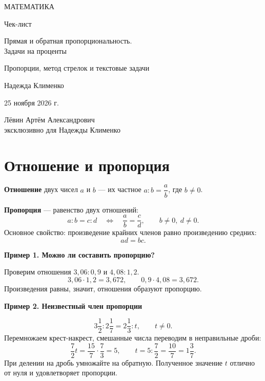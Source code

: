\documentclass[a4paper,12pt]{article}
\newcommand{\ex}[1]{\par\smallskip\textcolor{darkaccent}{\textbf{#1}}\par}
\begin{document}
\begin{titlepage}
\centering
\vspace*{28mm}
{\Large\color{darkaccent} МАТЕМАТИКА\par}
\vspace{16mm}
{\Huge Чек-лист\par}
\vspace{10mm}
{\LARGE\color{accent} Прямая и обратная пропорциональность.\\[2mm] Задачи на проценты\par}
\vspace{14mm}
{\large Пропорции, метод стрелок и текстовые задачи\par}
\vfill
{\large Надежда Клименко\par}
\vspace{9mm}
25 ноября 2026 г.\par
\vspace{17mm}
{\small Лёвин Артём Александрович\\эксклюзивно для Надежды Клименко\par}
\vspace{19mm}
\vspace{3mm}
\end{titlepage}
\setcounter{page}{1}
\section{Отношение и пропорция}
\textbf{Отношение} двух чисел $a$ и $b$ — их частное $a:b=\dfrac ab$, где $b\ne0$.

\textbf{Пропорция} — равенство двух отношений:
\[ a:b=c:d\quad\Longleftrightarrow\quad \frac ab=\frac cd,\qquad b\ne0,\ d\ne0. \]
Основное свойство: произведение крайних членов равно произведению средних:
\[\boxed{ad=bc}.\]
\begin{center}
\end{center}
\ex{Пример 1. Можно ли составить пропорцию?}
Проверим отношения $3{,}06:0{,}9$ и $4{,}08:1{,}2$.
\[3{,}06\cdot1{,}2=3{,}672,\qquad 0{,}9\cdot4{,}08=3{,}672.\]
Произведения равны, значит, отношения образуют пропорцию.
\ex{Пример 2. Неизвестный член пропорции}
\[3\frac12:2\frac17=2\frac13:t,\qquad t\ne0.\]
Перемножаем крест-накрест, смешанные числа переводим в неправильные дроби:
\[\frac72t=\frac{15}{7}\cdot\frac73=5,\qquad t=5:\frac72=\frac{10}{7}=1\frac37.\]
При делении на дробь умножайте на обратную. Полученное значение $t$ отлично от нуля и удовлетворяет пропорции.
\clearpage
\end{document}
